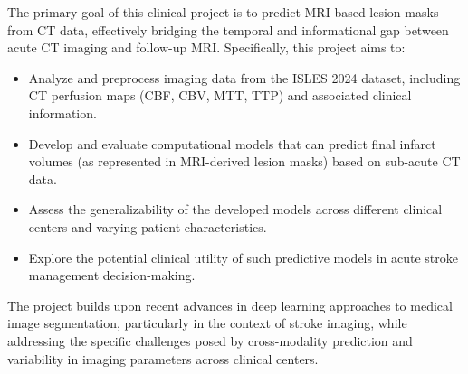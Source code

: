 The primary goal of this clinical project is to predict MRI-based lesion masks from CT data, effectively bridging the temporal and informational gap between acute CT imaging and follow-up MRI. Specifically, this project aims to:

\begin{itemize}
    \item Analyze and preprocess imaging data from the ISLES 2024 dataset, including CT perfusion maps (CBF, CBV, MTT, TTP) and associated clinical information.
    
    \item Develop and evaluate computational models that can predict final infarct volumes (as represented in MRI-derived lesion masks) based on sub-acute CT data.
    
    \item Assess the generalizability of the developed models across different clinical centers and varying patient characteristics.
    
    \item Explore the potential clinical utility of such predictive models in acute stroke management decision-making.
\end{itemize}

The project builds upon recent advances in deep learning approaches to medical image segmentation, particularly in the context of stroke imaging, while addressing the specific challenges posed by cross-modality prediction and variability in imaging parameters across clinical centers.

